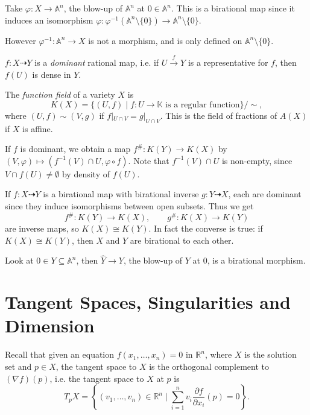 \documentclass[12pt]{article}
\begin{document}
\begin{exbox}
	Take $\varphi : X \to \mathbb{A}^n$, the blow-up of $\mathbb{A}^n$ at $0 \in \mathbb{A}^n$. This is a birational map since it induces an isomorphism $\varphi : \varphi^{-1}(\mathbb{A}^n \setminus \{0\}) \to \mathbb{A}^n \setminus \{0\}$.

	However $\varphi^{-1} : \mathbb{A}^n \to X$ is not a morphism, and is only defined on $\mathbb{A}^n \setminus \{0\}$.
\end{exbox}

\begin{remark}
	$f : X \dashrightarrow Y$ is a \emph{dominant} rational map, i.e. if $U \overset f \to Y$ is a representative for $f$, then $f(U)$ is dense in $Y$.
\end{remark}

\begin{definition}
	The \emph{function field} of a variety $X$ is
	\[
		K(X) = \{(U, f) \mid f : U \to \mathbb{K} \text{ is a regular function}\}/\sim,
	\]
	where $(U, f) \sim (V, g)$ if $f|_{U \cap V} = g|_{U \cap V}$. This is the field of fractions of $A(X)$ if $X$ is affine.

	If $f$ is dominant, we obtain a map $f^\# : K(Y) \to K(X)$ by $(V, \varphi) \mapsto (f^{-1}(V) \cap U, \varphi \circ f)$. Note that $f^{-1}(V) \cap U$ is non-empty, since $V \cap f(U) \neq \emptyset$ by density of $f(U)$.
\end{definition}

If $f : X \dashrightarrow Y$ is a birational map with birational inverse $g : Y \dashrightarrow X$, each are dominant since they induce isomorphisms between open subsets. Thus we get
\[
f^\# : K(Y) \to K(X), \qquad g^\# : K(X) \to K(Y)
\]
are inverse maps, so $K(X) \cong K(Y)$. In fact the converse is true: if $K(X) \cong K(Y)$, then $X$ and $Y$ are birational to each other.

\begin{exbox}
	Look at $0 \in Y \subseteq \mathbb{A}^n$, then $\hat Y \to Y$, the blow-up of $Y$ at $0$, is a birational morphism.
\end{exbox}

\newpage

\section{Tangent Spaces, Singularities and Dimension}
\label{sec:ts_s_d}

Recall that given an equation $f(x_1, \ldots, x_n) = 0$ in $\mathbb{R}^n$, where $X$ is the solution set and $p \in X$, the tangent space to $X$ is the orthogonal complement to $(\nabla f)(p)$, i.e. the tangent space to $X$ at $p$ is
\[
	T_p X = \left\{(v_1, \ldots, v_n) \in \mathbb{R}^n \mid \sum_{i = 1}^n v_i \frac{\partial f}{\partial x_i}(p) = 0 \right\}.
\]
\end{document}
